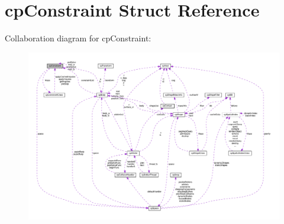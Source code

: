 \hypertarget{structcpConstraint}{}\section{cp\+Constraint Struct Reference}
\label{structcpConstraint}


Collaboration diagram for cp\+Constraint\+:
\nopagebreak
\begin{figure}[H]
\begin{center}
\leavevmode
\includegraphics[width=350pt]{structcpConstraint__coll__graph}
\end{center}
\end{figure}
